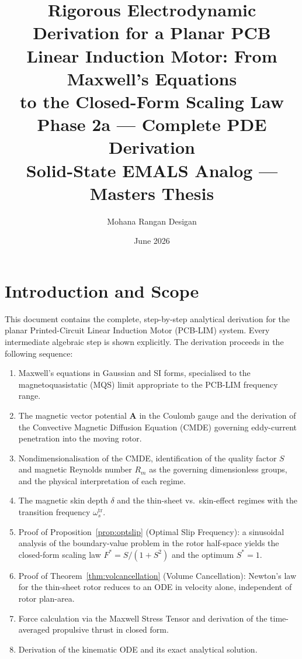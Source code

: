 \documentclass[12pt, a4paper]{article}
\title{%
  \textbf{Rigorous Electrodynamic Derivation for a Planar PCB\\
  Linear Induction Motor: From Maxwell's Equations\\
  to the Closed-Form Scaling Law}\\[0.5em]
  \large Phase 2a — Complete PDE Derivation\\
  \large Solid-State EMALS Analog — Masters Thesis
}
\author{Mohana Rangan Desigan}
\date{June 2026}
\theoremstyle{plain}
\theoremstyle{definition}
\newcommand{\vA}{\mathbf{A}}
\newcommand{\Rm}{R_m}
\newcommand{\Fstar}{F^*}
\begin{document}
\maketitle
\tableofcontents
\newpage

\section{Introduction and Scope}

This document contains the complete, step-by-step analytical derivation for the planar
Printed-Circuit Linear Induction Motor (PCB-LIM) system. Every intermediate algebraic
step is shown explicitly. The derivation proceeds in the following sequence:

\begin{enumerate}[label=\arabic*.]
  \item Maxwell's equations in Gaussian and SI forms, specialised to the magnetoquasistatic
        (MQS) limit appropriate to the PCB-LIM frequency range.
  \item The magnetic vector potential $\vA$ in the Coulomb gauge and the derivation of
        the Convective Magnetic Diffusion Equation (CMDE) governing eddy-current
        penetration into the moving rotor.
  \item Nondimensionalisation of the CMDE, identification of the quality factor $S$ and
        magnetic Reynolds number $\Rm$ as the governing dimensionless groups, and the
        physical interpretation of each regime.
  \item The magnetic skin depth $\delta$ and the thin-sheet vs.\ skin-effect regimes with
        the transition frequency $\omega_s^{\mathrm{tr}}$.
  \item Proof of Proposition~\ref{prop:optslip} (Optimal Slip Frequency): a sinusoidal
        analysis of the boundary-value problem in the rotor half-space yields the closed-form
        scaling law $\Fstar = S/(1+S^2)$ and the optimum $S^* = 1$.
  \item Proof of Theorem~\ref{thm:volcancellation} (Volume Cancellation): Newton's law for
        the thin-sheet rotor reduces to an ODE in velocity alone, independent of rotor
        plan-area.
  \item Force calculation via the Maxwell Stress Tensor and derivation of the
        time-averaged propulsive thrust in closed form.
  \item Derivation of the kinematic ODE and its exact analytical solution.
\end{enumerate}
\end{document}
